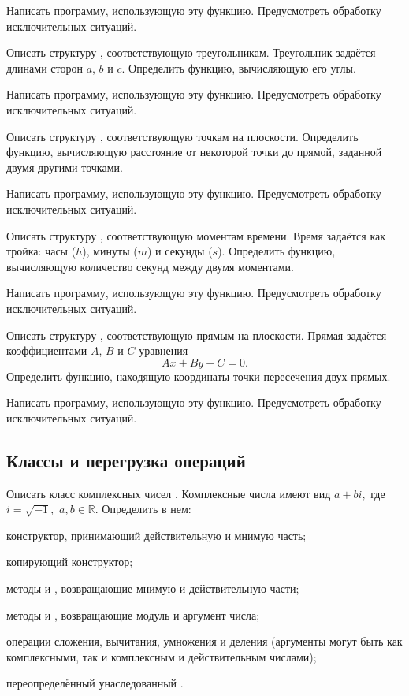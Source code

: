 Написать программу, использующую эту функцию. Предусмотреть обработку
исключительных ситуаций.

\task Описать структуру , соответствующую
треугольникам. Треугольник задаётся длинами сторон $a$, $b$ и $c$.
Определить функцию, вычисляющую его углы.

Написать программу, использующую эту функцию. Предусмотреть обработку
исключительных ситуаций.

\task Описать структуру , соответствующую точкам на
плоскости. Определить функцию, вычисляющую расстояние от некоторой
точки до прямой, заданной двумя другими точками.

Написать программу, использующую эту функцию. Предусмотреть обработку
исключительных ситуаций.

\task Описать структуру , соответствующую моментам
времени. Время задаётся как тройка: часы ($h$), минуты ($m$) и секунды
($s$). Определить функцию, вычисляющую количество секунд между двумя
моментами.

Написать программу, использующую эту функцию. Предусмотреть обработку
исключительных ситуаций.

\task Описать структуру , соответствующую прямым на
плоскости. Прямая задаётся коэффициентами $A$, $B$ и $C$ уравнения
\[
Ax+By+C=0.
\]
Определить функцию, находящую координаты точки пересечения двух
прямых.

Написать программу, использующую эту функцию. Предусмотреть обработку
исключительных ситуаций.


\subsection{Классы и перегрузка операций}

\task Описать класс комплексных чисел . Комплексные числа
имеют вид $a+bi,$ где $i=\sqrt{-1},$ $a,b \in \mathbb{R}$. Определить
в нем:
\begin{itemize*}
\item конструктор, принимающий действительную и мнимую часть;
\item копирующий конструктор;
\item методы  и , возвращающие мнимую и действительную
  части;
\item методы  и , возвращающие модуль и аргумент
  числа;
\item операции сложения, вычитания, умножения и деления (аргументы
  могут быть как комплексными, так и комплексным и действительным
  числами);
\item переопределённый унаследованный .
\end{itemize*}

